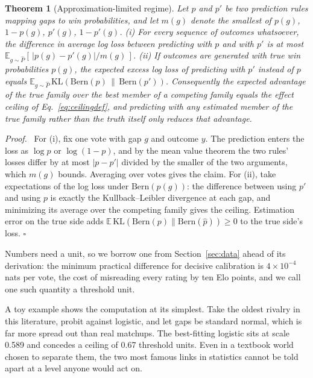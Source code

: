\documentclass[10pt]{article}
\newtheorem{theorem}{Theorem}
\newenvironment{proof}{\par\noindent\textit{Proof.}\ }{\hfill$\square$\par}
\begin{document}
\begin{theorem}[Approximation-limited regime]\label{thm:ceiling}
Let $p$ and $p'$ be two prediction rules mapping gaps to win
probabilities, and let $m(g)$ denote the smallest of $p(g)$,
$1-p(g)$, $p'(g)$, $1-p'(g)$.
\emph{(i)} For every sequence of outcomes whatsoever, the difference
in average log loss between predicting with $p$ and with $p'$ is at
most $\mathbb{E}_{g\sim\hat P}\!\left[\,|p(g)-p'(g)|/m(g)\,\right]$.
\emph{(ii)} If outcomes are generated with true win probabilities
$p(g)$, the expected excess log loss of predicting with $p'$ instead
of $p$ equals
$\mathbb{E}_{g\sim\hat P}\,\mathrm{KL}(\mathrm{Bern}(p)\,\|\,
\mathrm{Bern}(p'))$. Consequently the expected advantage of the true
family over the best member of a competing family equals the effect
ceiling of Eq.~\eqref{eq:ceilingdef}, and predicting with any
estimated member of the true family rather than the truth itself only
reduces that advantage.
\end{theorem}

\begin{proof}
For (i), fix one vote with gap $g$ and outcome $y$. The prediction
enters the loss as $\log p$ or $\log(1-p)$, and by the mean value
theorem the two rules' losses differ by at most
$|p - p'|$ divided by the smaller of the two arguments, which $m(g)$
bounds. Averaging over votes gives the claim. For (ii), take
expectations of the log loss under $\mathrm{Bern}(p(g))$: the
difference between using $p'$ and using $p$ is exactly the
Kullback--Leibler divergence at each gap, and minimizing its average
over the competing family gives the ceiling. Estimation error on the
true side adds
$\mathbb{E}\,\mathrm{KL}(\mathrm{Bern}(p)\| \mathrm{Bern}(\hat p))
\geq 0$ to the true side's loss.
\end{proof}

Numbers need a unit, so we borrow one from Section~\ref{sec:data}
ahead of its derivation: the minimum practical difference for decisive
calibration is $4 \times 10^{-4}$ nats per vote, the cost of
misreading every rating by ten Elo points, and we call one such
quantity a threshold unit.

A toy example shows the computation at its simplest. Take the oldest
rivalry in this literature, probit against logistic, and let gaps be
standard normal, which is far more spread out than real matchups. The
best-fitting logistic sits at scale 0.589 and concedes a ceiling of
0.67 threshold units. Even in a textbook world chosen to separate
them, the two most famous links in statistics cannot be told apart at
a level anyone would act on.
\end{document}
